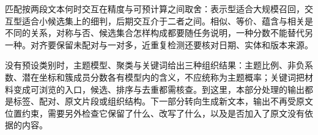 匹配按两段文本何时交互在精度与可预计算之间取舍：表示型适合大规模召回，交互型适合小候选集上的细判，后期交互介于二者之间。相似、等价、蕴含与相关是不同的关系，对称与否、候选集合怎样构成都要随任务说明，一种分数不能替代另一种。对齐要保留未配对与一对多，近重复检测还要核对日期、实体和版本来源。

没有预设类别时，主题模型、聚类与关键词给出三种组织结果：主题比例、非负系数、潜在坐标和簇成员分数各有模型内的含义，不应统称为主题概率；关键词把材料变成可浏览的入口，候选、排序与去重都需核查。到这里，本部分处理的输出都是标签、配对、原文片段或组织结构。下一部分转向生成新文本，输出不再受原文位置约束，需要另外检查它保留了什么、改写了什么，以及是否加入了原文没有依据的内容。
